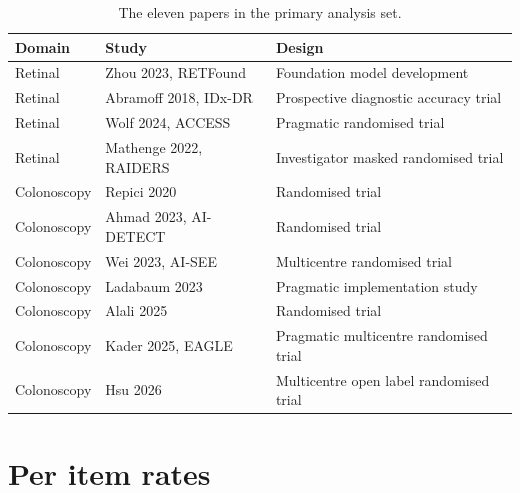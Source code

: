 \documentclass{article}
\begin{document}
\begin{table}[h]
  \caption{The eleven papers in the primary analysis set.}
  \label{tab:corpus}
  \centering
  \small
  \begin{tabular}{llp{6.2cm}}
    \toprule
    Domain & Study & Design \\
    \midrule
    Retinal     & Zhou 2023, RETFound \cite{zhou2023}       & Foundation model development \\
    Retinal     & Abramoff 2018, IDx-DR \cite{abramoff2018} & Prospective diagnostic accuracy trial \\
    Retinal     & Wolf 2024, ACCESS \cite{wolf2024}         & Pragmatic randomised trial \\
    Retinal     & Mathenge 2022, RAIDERS \cite{mathenge2022} & Investigator masked randomised trial \\
    Colonoscopy & Repici 2020 \cite{repici2020}             & Randomised trial \\
    Colonoscopy & Ahmad 2023, AI-DETECT \cite{ahmad2023}    & Randomised trial \\
    Colonoscopy & Wei 2023, AI-SEE \cite{wei2023}           & Multicentre randomised trial \\
    Colonoscopy & Ladabaum 2023 \cite{ladabaum2023}         & Pragmatic implementation study \\
    Colonoscopy & Alali 2025 \cite{alali2025}               & Randomised trial \\
    Colonoscopy & Kader 2025, EAGLE \cite{kader2025}        & Pragmatic multicentre randomised trial \\
    Colonoscopy & Hsu 2026 \cite{hsu2026}                   & Multicentre open label randomised trial \\
    \bottomrule
  \end{tabular}
\end{table}

\section{Per item rates}
\label{app:items-rates}
\end{document}

